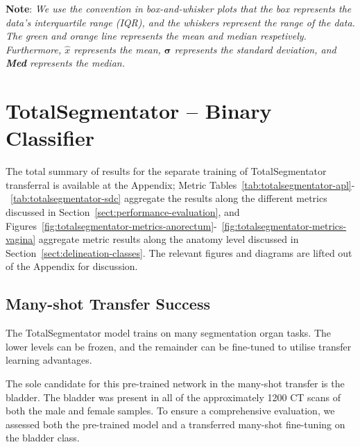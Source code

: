 \documentclass[11pt,twoside]{report}
\begin{document}
\textbf{Note}: \textit{We use the convention in box-and-whisker plots that the box represents the data's interquartile range (IQR), and the whiskers represent the range of the data. The green and orange line represents the mean and median respetively. Furthermore, $\hat{x}$ represents the mean, $\mathbf\sigma$ represents the standard deviation, and \textbf{Med} represents the median.}

\section{TotalSegmentator -- Binary Classifier}

The total summary of results for the separate training of TotalSegmentator transferral is available at the Appendix; Metric Tables~\ref{tab:totalsegmentator-apl}-~\ref{tab:totalsegmentator-sdc} aggregate the results along the different metrics discussed in Section~\ref{sect:performance-evaluation}, and Figures~\ref{fig:totalsegmentator-metrics-anorectum}-~\ref{fig:totalsegmentator-metrics-vagina} aggregate metric results along the anatomy level discussed in Section~\ref{sect:delineation-classes}. The relevant figures and diagrams are lifted out of the Appendix for discussion.


\subsection{Many-shot Transfer Success}\label{sec:totalsegmentator-many-shot-transfer-success}

The TotalSegmentator model trains on many segmentation organ tasks. The lower levels can be frozen, and the remainder can be fine-tuned to utilise transfer learning advantages. 

The sole candidate for this pre-trained network in the many-shot transfer is the bladder. The bladder was present in all of the approximately 1200 CT scans of both the male and female samples. To ensure a comprehensive evaluation, we assessed both the pre-trained model and a transferred many-shot fine-tuning on the bladder class.
\end{document}

